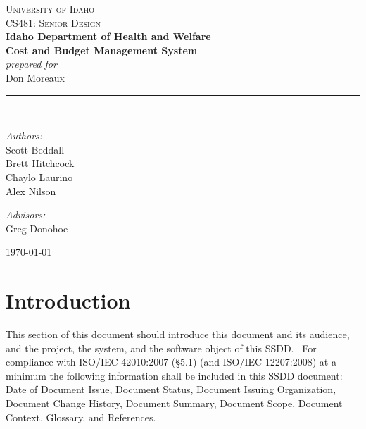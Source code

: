 \documentclass[letterpaper]{article}
\newcommand{\HRule}{\rule{5cm}{0.1mm}}
\begin{document}
\begin{center}



\textsc{\Large University of Idaho}\\[0.2cm]

\textsc{\Large CS481: Senior Design}\\[2cm]


{ \LARGE \bfseries Idaho Department of Health and Welfare}\\[0.4cm]
{ \huge \bfseries Cost and Budget Management System}\\[1.0cm]
{ \normalsize \emph{ prepared for}}\\[0.5cm]
{ \normalsize Don Moreaux}\\[0.5cm]
\HRule \\[3cm]

\begin{minipage}{0.4\textwidth}
\begin{flushleft} \large
\emph{Authors:}\\
Scott Beddall\\
Brett Hitchcock\\
Chaylo Laurino\\
Alex Nilson
\end{flushleft}
\end{minipage}
\begin{minipage}{0.4\textwidth}
\begin{flushright} \large
\emph{Advisors:} \\
Greg Donohoe\\
\bigskip
\bigskip
\bigskip
\bigskip
\end{flushright}
\end{minipage}

\vfill

{\large \today}

\end{center}
\pagebreak
\tableofcontents
\pagebreak
\section{Introduction}
This section of this document should introduce this document and its
audience, and the project, the system, and the software object of this
SSDD. \ For compliance with ISO/IEC 42010:2007 (§5.1) (and ISO/IEC
12207:2008) at a minimum the following information shall be included in
this SSDD document: Date of Document Issue, Document Status, Document
Issuing Organization, Document Change History, Document Summary,
Document Scope, Document Context, Glossary, and References.
\end{document}
